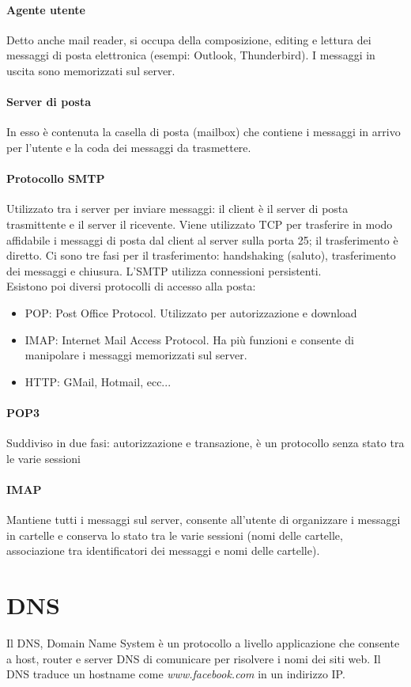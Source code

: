 \documentclass{report}
\begin{document}
	\paragraph{Agente utente} Detto anche mail reader, si occupa della composizione, editing e lettura dei messaggi di posta elettronica (esempi: Outlook, Thunderbird). I messaggi in uscita sono memorizzati sul server.
	\paragraph{Server di posta} In esso è contenuta la casella di posta (mailbox) che contiene i messaggi in arrivo per l'utente e la coda dei messaggi da trasmettere.
	\paragraph{Protocollo SMTP} Utilizzato tra i server per inviare messaggi: il client è il server di posta trasmittente e il server il ricevente. Viene utilizzato TCP per trasferire in modo affidabile i messaggi di posta dal client al server sulla porta 25; il trasferimento è diretto. Ci sono tre fasi per il trasferimento: handshaking (saluto), trasferimento dei messaggi e chiusura. L'SMTP utilizza connessioni persistenti.
	\medskip\\Esistono poi diversi protocolli di accesso alla posta:
	\begin{itemize}
		\item POP: Post Office Protocol. Utilizzato per autorizzazione e download
		\item IMAP: Internet Mail Access Protocol. Ha più funzioni e consente di manipolare i messaggi memorizzati sul server.
		\item HTTP: GMail, Hotmail, ecc...
	\end{itemize}
	\paragraph{POP3} Suddiviso in due fasi: autorizzazione e transazione, è un protocollo senza stato tra le varie sessioni
	\paragraph{IMAP} Mantiene tutti i messaggi sul server, consente all'utente di organizzare i messaggi in cartelle e conserva lo stato tra le varie sessioni (nomi delle cartelle, associazione tra identificatori dei messaggi e nomi delle cartelle).
	\section{DNS}
	Il DNS, Domain Name System è un protocollo a livello applicazione che consente a host, router e server DNS di comunicare per risolvere i nomi dei siti web. Il DNS traduce un hostname come \textit{www.facebook.com} in un indirizzo IP.
\end{document}
